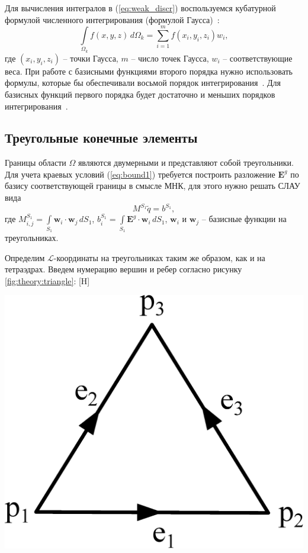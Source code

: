 \documentclass[a4paper,14pt]{article}
\makeatletter
\renewenvironment{figure}[1][\fps@figure]{
  \edef\@tempa{\noexpand\@float{figure}[#1]}
  \@tempa
  \addtocounter{foofigure}{1}
}{
  \end@float
}
\makeatother
\begin{document}
Для вычисления интегралов в (\ref{eq:weak_discr}) воспользуемся кубатурной формулой численного интегрирования (формулой Гаусса)~\citep{misovskih}:
\begin{equation*}
	\int\limits_{\Omega_k} f(x, y, z) \,d\Omega_k = \sum\limits_{i = 1}^m f( x_i , y_i , z_i ) w_i ,
\end{equation*}
где $(x_i , y_i , z_i )$ -- точки Гаусса, $m$ -- число точек Гаусса, $w_i$ -- соответствующие веса. При работе с базисными функциями второго порядка нужно использовать формулы, которые бы обеспечивали восьмой порядок интегрирования~\citep{zhang_integration}. Для базисных функций первого порядка будет достаточно и меньших порядков интегрирования~\citep{tet_integration, misovskih}.


\subsection{Треугольные конечные элементы}

Границы области $\Omega$ являются двумерными и представляют собой треугольники. Для учета краевых условий (\ref{eq:bound1}) требуется построить разложение $\mathbf{E}^g$ по базису соответствующей границы в смысле МНК, для этого нужно решать СЛАУ вида
\begin{equation}
	M^{S_1} \tilde{q} = b^{S_1} ,
	\label{eq:bound_mnk}
\end{equation}
где $\displaystyle M^{S_1}_{i,j} = \int\limits_{S_1} \mathbf{w}_i \cdot \mathbf{w}_j \,d S_1$, $\displaystyle b^{S_1}_{i} = \int\limits_{S_1} \mathbf{E}^g \cdot \mathbf{w}_i \,d S_1$, $\mathbf{w}_i$ и $\mathbf{w}_j$ -- базисные функции на треугольниках.

Определим $\mathcal{L}$-координаты на треугольниках таким же образом, как и на тетраэдрах. Введем нумерацию вершин и ребер согласно рисунку \ref{fig:theory:triangle}:
\begin{figure}[H]
	\centering
	\includegraphics[scale=0.25]{theory/triangle.eps}
	\caption{треугольный конечный элемент}
	\label{fig:theory:triangle}
\end{figure}
\end{document}

